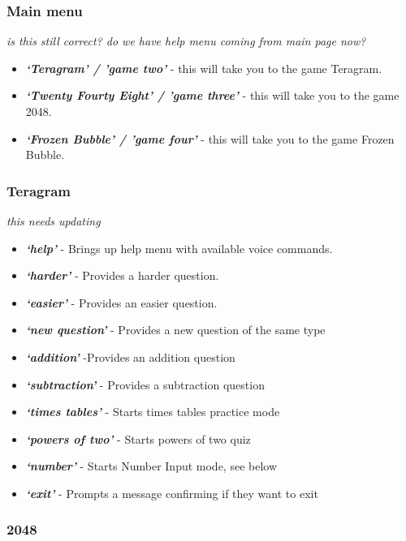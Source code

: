 \documentclass[11pt, oneside]{article}
\begin{document}
\subsubsection{Main menu}

{\em is this still correct? do we have help menu coming from main page now?}

\begin{itemize}
  \item {\em\bf`Teragram' / 'game two'}  - this will take you to the game Teragram.
  \item {\em\bf`Twenty Fourty Eight' / 'game three'} - this will take you to the game 2048.
  \item {\em\bf`Frozen Bubble' / 'game four'} - this will take you to the game Frozen Bubble.
\end{itemize}

\subsubsection{Teragram}

{\em this needs updating}
\begin{itemize}
  \item {\em\bf`help'} - Brings up help menu with available voice commands. 
  \item {\em\bf`harder'} - Provides a harder question. 
  \item {\em\bf`easier'} - Provides an easier question.
  \item {\em\bf`new question'} - Provides a new question of the same type
  \item {\em\bf`addition'} -Provides an addition question
  \item {\em\bf`subtraction'} - Provides a subtraction question
  \item {\em\bf`times tables'} - Starts times tables practice mode
  \item {\em\bf`powers of two'} - Starts powers of two quiz
  \item {\em\bf`number'} - Starts Number Input mode, see below
  \item {\em\bf`exit'} - Prompts a message confirming if they want to exit
 
\end{itemize}

\subsubsection{2048}
\end{document}

